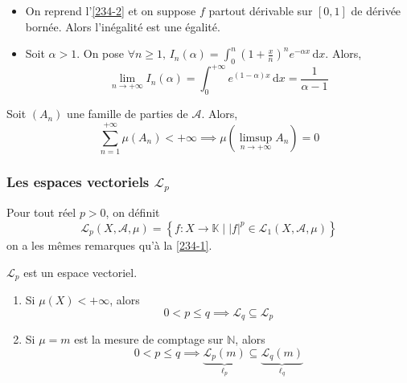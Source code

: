 	\begin{example}
		\begin{itemize}
			\item On reprend l'\cref{234-2} et on suppose $f$ partout dérivable sur $[0,1]$ de dérivée bornée. Alors l'inégalité est une égalité.
			\item Soit $\alpha > 1$. On pose $\forall n \geq 1, \, I_n(\alpha) = \int_0^n \left( 1 + \frac{x}{n} \right)^n e^{-\alpha x} \, \mathrm{d}x$. Alors,
			\[ \lim_{n \rightarrow +\infty} I_n(\alpha) = \int_0^{+\infty} e^{(1-\alpha)x} \, \mathrm{d}x = \frac{1}{\alpha - 1} \]
		\end{itemize}
	\end{example}

	\begin{application}
		Soit $(A_n)$ une famille de parties de $\mathcal{A}$. Alors,
		\[ \sum_{n=1}^{+\infty} \mu(A_n) < +\infty \implies \mu \left( \limsup_{n \rightarrow +\infty} A_n \right) = 0 \]
	\end{application}

	\subsubsection{Les espaces vectoriels \texorpdfstring{$\mathcal{L}_p$}{Lₚ}}


	\begin{definition}
		Pour tout réel $p > 0$, on définit
		\[ \mathcal{L}_p(X, \mathcal{A}, \mu) = \left\{ f : X \rightarrow \mathbb{K} \mid |f|^p \in \mathcal{L}_1(X, \mathcal{A}, \mu) \right\} \]
		on a les mêmes remarques qu'à la \cref{234-1}.
	\end{definition}

	\begin{proposition}
		$\mathcal{L}_p$ est un espace vectoriel.
	\end{proposition}

	\begin{proposition}
		\begin{enumerate}[label=(\roman*)]
			\item Si $\mu(X) < +\infty$, alors
			\[ 0 < p \leq q \implies \mathcal{L}_q \subseteq \mathcal{L}_p \]
			\item Si $\mu = m$ est la mesure de comptage sur $\mathbb{N}$, alors
			\[ 0 < p \leq q \implies \underbrace{\mathcal{L}_p(m)}_{\ell_p} \subseteq \underbrace{\mathcal{L}_q(m)}_{\ell_q} \]
		\end{enumerate}
	\end{proposition}

